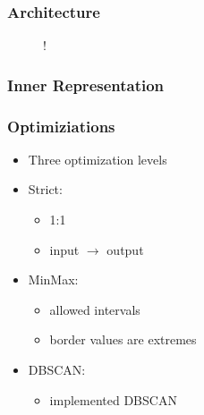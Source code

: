 \documentclass[10pt,xcolor=pdflatex]{beamer}
\begin{document}
\begin{frame}\frametitle{Architecture}
  \begin{figure}[h]
  \centering
  \resizebox {\textwidth} {!} {
    
  }
  \label{fig:tikz:architecture}
\end{figure}
\end{frame}

\begin{frame}\frametitle{Inner Representation}
  \begin{figure}[h]
  \centering
  \label{fig:tikz:IDStree}
\end{figure}
\end{frame}

\begin{frame}\frametitle{Optimiziations}

  \begin{itemize}
    \item Three optimization levels
  \end{itemize}
  \vspace{1cm}

  \begin{itemize}
    \item Strict:
    \begin{itemize}
      \item 1:1
      \item input $\rightarrow$ output
    \end{itemize}
    \item MinMax:
    \begin{itemize}
      \item allowed intervals
      \item border values are extremes
    \end{itemize}
    \item DBSCAN:
    \begin{itemize}
      \item implemented DBSCAN\cite{Mahesh_Kumar2016, Schubert:2017:DRR:3129336.3068335}
    \end{itemize}
  \end{itemize}
\end{frame}
\end{document}
